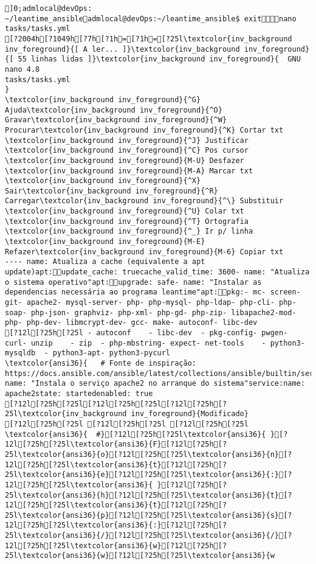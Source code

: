 \documentclass{scrartcl}
\title{}
\begin{document}
\begin{Verbatim}
]0;admlocal@devOps: ~/leantime_ansibleadmlocal@devOps:~/leantime_ansible$ exitnano tasks/tasks.yml 
[?2004h[?1049h[?7h[?1h=[?1h=[?25l\textcolor{inv_background inv_foreground}{[ A ler... ]}\textcolor{inv_background inv_foreground}{[ 55 linhas lidas ]}\textcolor{inv_background inv_foreground}{  GNU nano 4.8                                                tasks/tasks.yml                                                             }
\textcolor{inv_background inv_foreground}{^G} Ajuda\textcolor{inv_background inv_foreground}{^O} Gravar\textcolor{inv_background inv_foreground}{^W} Procurar\textcolor{inv_background inv_foreground}{^K} Cortar txt    \textcolor{inv_background inv_foreground}{^J} Justificar    \textcolor{inv_background inv_foreground}{^C} Pos cursor    \textcolor{inv_background inv_foreground}{M-U} Desfazer     \textcolor{inv_background inv_foreground}{M-A} Marcar txt
\textcolor{inv_background inv_foreground}{^X} Sair\textcolor{inv_background inv_foreground}{^R} Carregar\textcolor{inv_background inv_foreground}{^\} Substituir    \textcolor{inv_background inv_foreground}{^U} Colar txt     \textcolor{inv_background inv_foreground}{^T} Ortografia    \textcolor{inv_background inv_foreground}{^_} Ir p/ linha   \textcolor{inv_background inv_foreground}{M-E} Refazer\textcolor{inv_background inv_foreground}{M-6} Copiar txt
---- name: Atualiza a cache (equivalente a apt update)apt:update_cache: truecache_valid_time: 3600- name: "Atualiza o sistema operativo"apt:upgrade: safe- name: "Instalar as dependencias necessária ao programa leantime"apt:pkg:- mc- screen- git- apache2- mysql-server- php- php-mysql- php-ldap- php-cli- php-soap- php-json- graphviz- php-xml- php-gd- php-zip- libapache2-mod-php- php-dev- libmcrypt-dev- gcc- make- autoconf- libc-dev
[?12l[?25h[?25l - autoconf    - libc-dev  - pkg-config- pwgen- curl- unzip    - zip  - php-mbstring- expect- net-tools    - python3-mysqldb  - python3-apt- python3-pycurl
\textcolor{ansi36}{   # Fonte de inspiração: https://docs.ansible.com/ansible/latest/collections/ansible/builtin/service_module.html}- name: "Instala o serviço apache2 no arranque do sistema"service:name: apache2state: startedenabled: true
[?12l[?25h[?25l[?12l[?25h[?25l[?12l[?25h[?25l\textcolor{inv_background inv_foreground}{Modificado}
[?12l[?25h[?25l [?12l[?25h[?25l [?12l[?25h[?25l
\textcolor{ansi36}{  #}[?12l[?25h[?25l\textcolor{ansi36}{ }[?12l[?25h[?25l\textcolor{ansi36}{F}[?12l[?25h[?25l\textcolor{ansi36}{o}[?12l[?25h[?25l\textcolor{ansi36}{n}[?12l[?25h[?25l\textcolor{ansi36}{t}[?12l[?25h[?25l\textcolor{ansi36}{e}[?12l[?25h[?25l\textcolor{ansi36}{:}[?12l[?25h[?25l\textcolor{ansi36}{ }[?12l[?25h[?25l\textcolor{ansi36}{h}[?12l[?25h[?25l\textcolor{ansi36}{t}[?12l[?25h[?25l\textcolor{ansi36}{t}[?12l[?25h[?25l\textcolor{ansi36}{p}[?12l[?25h[?25l\textcolor{ansi36}{s}[?12l[?25h[?25l\textcolor{ansi36}{:}[?12l[?25h[?25l\textcolor{ansi36}{/}[?12l[?25h[?25l\textcolor{ansi36}{/}[?12l[?25h[?25l\textcolor{ansi36}{w}[?12l[?25h[?25l\textcolor{ansi36}{w}[?12l[?25h[?25l\textcolor{ansi36}{w

\end{Verbatim}
\end{document}
